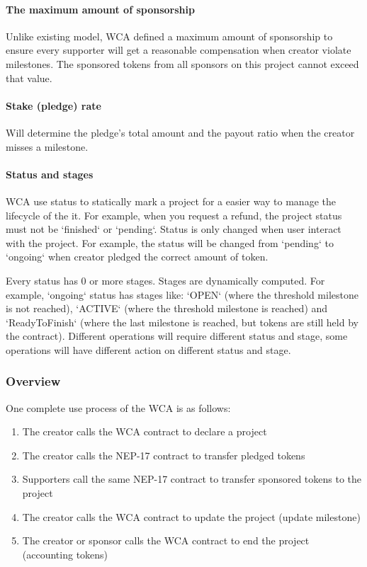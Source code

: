 \paragraph{The maximum amount of sponsorship}

Unlike existing model, WCA defined a maximum amount of sponsorship to ensure
every supporter will get a reasonable compensation when creator violate milestones.
The sponsored tokens from all sponsors on this project cannot exceed that value.

\paragraph{Stake (pledge) rate}

Will determine the pledge's total amount and the payout ratio when the
creator misses a milestone.

\paragraph{Status and stages}

WCA use status to statically mark a project for a easier way to manage the
lifecycle of the it.
For example, when you request a refund, the project status must not be `finished`
or `pending`.
Status is only changed when user interact with the project.
For example, the status will be changed from `pending` to `ongoing` when creator
pledged the correct amount of token.

Every status has 0 or more stages.
Stages are dynamically computed.
For example, `ongoing` status has stages like: `OPEN` (where the threshold
milestone is not reached), `ACTIVE` (where the threshold milestone is reached)
and `ReadyToFinish` (where the last milestone is reached, but tokens are still
held by the contract).
Different operations will require different status and stage, some operations will
have different action on different status and stage.

\subsubsection{Overview}

One complete use process of the WCA is as follows:

\begin{enumerate}
    \item The creator calls the WCA contract to declare a project
    \item The creator calls the NEP-17 contract to transfer pledged tokens
    \item Supporters call the same NEP-17 contract to transfer sponsored tokens
    to the project\label{item:purchase_wca}
    \item The creator calls the WCA contract to update the project (update
    milestone)\label{item:update_milestone}
    \item The creator or sponsor calls the WCA contract to end the project
    (accounting tokens)\label{item:finish_project}
\end{enumerate}

